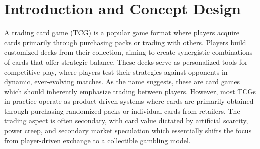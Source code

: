 \chapter{Introduction and Concept Design}

A trading card game (TCG) is a popular game format where players acquire cards primarily through purchasing packs or trading with others. Players build customized decks from their collection, aiming to create synergistic combinations of cards that offer strategic balance. These decks serve as personalized tools for competitive play, where players test their strategies against opponents in dynamic, ever-evolving matches. As the name suggests, these are card games which should inherently emphasize trading between players. However, most TCGs in practice operate as product-driven systems where cards are primarily obtained through purchasing randomized packs or individual cards from retailers. The trading aspect is often secondary, with card value dictated by artificial scarcity, power creep, and secondary market speculation which essentially shifts the focus from player-driven exchange to a collectible gambling model.


